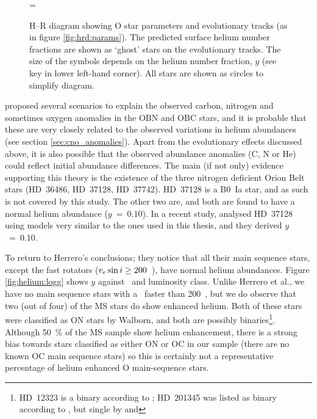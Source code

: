 \begin{figure} %
\epsfxsize=\figwidth
\setlength{\cen}{(\textwidth / 2) - (\epsfxsize / 2)}
\hspace{\cen}
\caption[H--R diagram with evolutionary helium fractions]
{\fcfont H--R diagram showing O star parameters and evolutionary
tracks (as in figure \ref{fig:hrd:params}). The predicted surface
helium number fractions are shown as `ghost' stars on the evolutionary
tracks. The size of the symbols depends on the helium number fraction,
$y$ (see key in lower left-hand corner). All stars are shown as
circles to simplify diagram.}
\label{fig:hrd:mod_y}
\end{figure}   %

 proposed several scenarios to explain the observed
carbon, nitrogen and sometimes oxygen anomalies in the OBN and OBC
stars, and it is probable that these are very closely related to the
observed variations in helium abundances (see section
\ref{sec:cno_anomalies}). Apart from the evolutionary effects
discussed above, it is also possible that the observed abundance
anomalies (C, N or He) could reflect initial abundance
differences. The main (if not only) evidence supporting this theory is
the existence of the three nitrogen deficient Orion Belt stars
(HD~36486, HD~37128, HD~37742). HD~37128 is a B0~Ia star, and as such
is not covered by this study. The other two are, and both are found to
have a normal helium abundance ($y~=~0.10$). In a recent study,
 analysed HD~37128 using models very similar to the
ones used in this thesis, and they derived $y$~=~0.10.

To return to Herrero's conclusions; they notice that all their main
sequence stars, except the fast rotators ($v_e \sin i \geq 200$~\kms),
have normal helium abundances. Figure \ref{fig:helium:logg} shows $y$
against \logg\ and luminosity class. Unlike Herrero et al., we have no
main sequence stars with a \vsini\ faster than 200~\kms, but we do
observe that two (out of four) of the MS stars do show enhanced
helium. Both of these stars were classified as ON stars by Walborn,
and both are possibly binaries\footnote{HD~12323 is a binary according to
; HD~201345 was listed as binary according to
, but single by  and
}. Although 50~\% of the MS sample show helium
enhancement, there is a strong bias towards stars classified as either
ON or OC in our sample (there are no known OC main sequence stars) so
this is certainly not a representative percentage of helium enhanced O
main-sequence stars.

